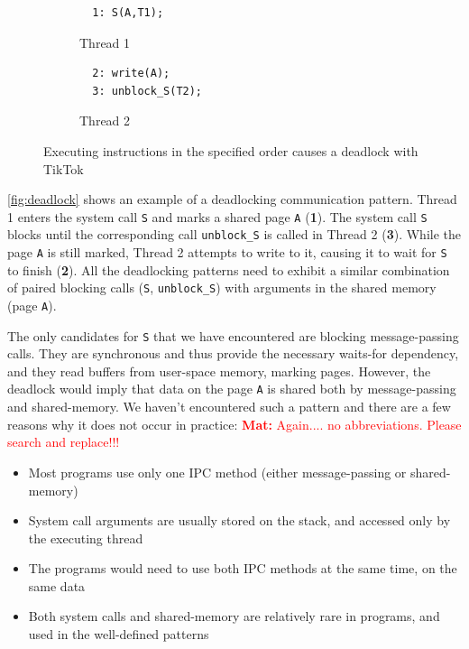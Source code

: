 \documentclass[conference]{IEEEtran}
\newcommand{\mat}[1]{\textcolor{red}{\textbf{Mat:} #1}}
\newcommand{\sysname}{TikTok}
\begin{document}
\begin{figure}
  \centering
  \begin{subfigure}[b]{0.45\linewidth}
  \begin{minipage}{\linewidth}
  \begin{lstlisting}
  1: S(A,T1);  
  \end{lstlisting}
  \end{minipage}
  \caption{Thread 1}
  \end{subfigure}
  \hfill
  \begin{subfigure}[b]{0.45\linewidth}
  \begin{minipage}{\linewidth}
  \begin{lstlisting}
  2: write(A);
  3: unblock_S(T2);
  \end{lstlisting}  
  \end{minipage}
  \caption{Thread 2}
  \end{subfigure}
  \caption{Executing instructions in the specified order causes a deadlock with \sysname}
  \label{fig:deadlock}
\end{figure}

\autoref{fig:deadlock} shows an example of a deadlocking communication pattern.
Thread 1 enters the system call \texttt{S} and marks a shared page \texttt{A}
(\textbf{1}). The system call \texttt{S} blocks until the corresponding call
\texttt{unblock\_S} is called in Thread 2 (\textbf{3}). While the page
\texttt{A} is still marked, Thread 2 attempts to write to it, causing it to wait
for \texttt{S} to finish (\textbf{2}). All the deadlocking patterns need to
exhibit a similar combination of paired blocking calls (\texttt{S},
\texttt{unblock\_S}) with arguments in the shared memory (page \texttt{A}).

The only candidates for \texttt{S} that we have
encountered are blocking message-passing calls. They are synchronous and thus
provide the necessary waits-for dependency, and they read buffers from
user-space memory, marking pages. However, the deadlock would imply that data on
the page \texttt{A} is shared both by message-passing and shared-memory. We
haven't encountered such a pattern and there are a few reasons why it does not
occur in practice:
\mat{Again.... no abbreviations. Please search and replace!!!}

\begin{itemize}
  \item Most programs use only one IPC method (either message-passing or
  shared-memory)
  \item System call arguments are usually stored on the stack, and accessed only
  by the executing thread
  \item The programs would need to use both IPC methods at the same time, on the
  same data
  \item Both system calls and shared-memory are relatively rare in programs, and
  used in the well-defined patterns
\end{itemize}
\end{document}
